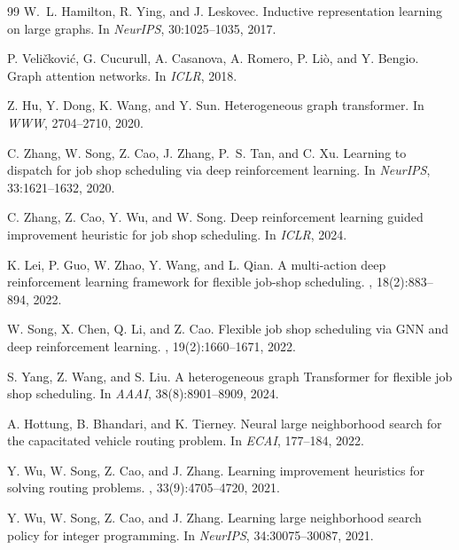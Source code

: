 \documentclass[10pt]{article}
\theoremstyle{definition}
\begin{document}
\begin{thebibliography}{99}
W.~L. Hamilton, R. Ying, and J. Leskovec.
\newblock Inductive representation learning on large
graphs.
\newblock In {\em NeurIPS}, 30:1025--1035, 2017.

P. Veli\v{c}kovi\'{c}, G. Cucurull, A. Casanova, A. Romero,
P. Li\`o, and Y. Bengio.
\newblock Graph attention networks.
\newblock In {\em ICLR}, 2018.

Z. Hu, Y. Dong, K. Wang, and Y. Sun.
\newblock Heterogeneous graph transformer.
\newblock In {\em WWW}, 2704--2710, 2020.

C. Zhang, W. Song, Z. Cao, J. Zhang, P.~S. Tan, and C. Xu.
\newblock Learning to dispatch for job shop scheduling via
deep reinforcement learning.
\newblock In {\em NeurIPS}, 33:1621--1632, 2020.

C. Zhang, Z. Cao, Y. Wu, and W. Song.
\newblock Deep reinforcement learning guided improvement
heuristic for job shop scheduling.
\newblock In {\em ICLR}, 2024.

K. Lei, P. Guo, W. Zhao, Y. Wang, and L. Qian.
\newblock A multi-action deep reinforcement learning
framework for flexible job-shop scheduling.
,
18(2):883--894, 2022.

W. Song, X. Chen, Q. Li, and Z. Cao.
\newblock Flexible job shop scheduling via GNN and deep
reinforcement learning.
,
19(2):1660--1671, 2022.

S. Yang, Z. Wang, and S. Liu.
\newblock A heterogeneous graph Transformer for flexible
job shop scheduling.
\newblock In {\em AAAI}, 38(8):8901--8909, 2024.

A. Hottung, B. Bhandari, and K. Tierney.
\newblock Neural large neighborhood search for the
capacitated vehicle routing problem.
\newblock In {\em ECAI}, 177--184, 2022.

Y. Wu, W. Song, Z. Cao, and J. Zhang.
\newblock Learning improvement heuristics for solving
routing problems.
, 33(9):4705--4720, 2021.

Y. Wu, W. Song, Z. Cao, and J. Zhang.
\newblock Learning large neighborhood search policy for
integer programming.
\newblock In {\em NeurIPS}, 34:30075--30087, 2021.


\end{thebibliography}
\end{document}
